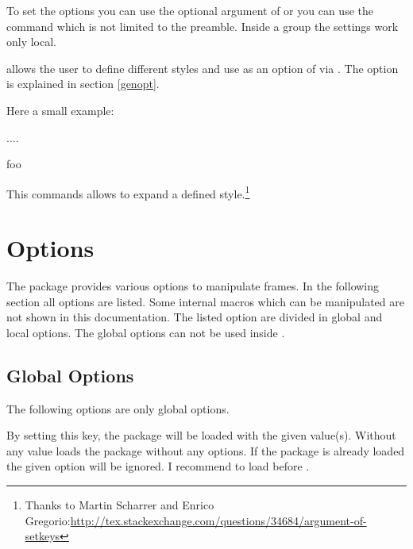 \documentclass[parskip=false,english,11pt]{ltxmdf}
\begin{document}
To set the options 
you can use the optional argument of  or
you can use the command  which is not limited to the preamble. Inside a group the settings work only local.

  allows the user to define different styles and use as an option of  via . The option  is explained in section \ref{genopt}.

Here a small example:
\begin{mdexample}[morekeywords={mystyle}]
....
\begin{mdframed}[style=mystyle]
foo
\end{mdframed}
\end{mdexample}

 This commands allows to expand a defined style.\footnote{Thanks to Martin Scharrer and Enrico Gregorio:\newline \href{http://tex.stackexchange.com/questions/34684/argument-of-setkeys}{http://tex.stackexchange.com/questions/34684/argument-of-setkeys}}



\section{Options}
The package provides various options to manipulate frames. In the following section all options are listed. Some internal macros which can be manipulated are not shown in this documentation.
The listed option are divided in global and local options. The global options can not be used inside .

\subsection{Global Options}\label{globopt}
The following options are only global options.

By setting this key, the package  will
be loaded with the given value(s). Without any value \mbox{\mdname} loads
the package  without any options. If the package  is already loaded the given option will be ignored. I recommend to load  before \mdname.
\end{document}
